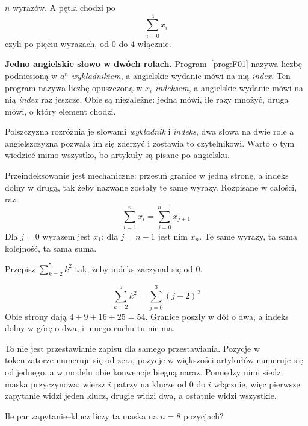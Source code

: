 \begin{fr}
\begin{ansblock}
$n$ wyrazów. A pętla chodzi po
\[ \sum_{i=0}^{4} x_i \]
czyli po pięciu wyrazach, od $0$ do $4$ włącznie.
\end{ansblock}

\begin{notationbox}
\textbf{Jedno angielskie słowo w dwóch rolach.} Program~\ref{prog:F01} nazywa
liczbę podniesioną w $a^{n}$ \emph{wykładnikiem}, a angielskie wydanie mówi na
nią \emph{index}. Ten program nazywa liczbę opuszczoną w $x_i$
\emph{indeksem}, a angielskie wydanie mówi na nią \emph{index} raz jeszcze.
Obie są niezależne: jedna mówi, ile razy mnożyć, druga mówi, o który element
chodzi.

Polszczyzna rozróżnia je słowami \dash{} \emph{wykładnik} i \emph{indeks},
dwa słowa na dwie role \dash{} a angielszczyzna pozwala im się zderzyć i
zostawia to czytelnikowi. Warto o tym wiedzieć mimo wszystko, bo artykuły są
pisane po angielsku.
\end{notationbox}

Przeindeksowanie jest mechaniczne: przesuń granice w jedną stronę, a indeks
dolny w drugą, tak żeby nazwane zostały te same wyrazy. Rozpisane w całości,
raz:
\[ \sum_{i=1}^{n} x_i = \sum_{j=0}^{n-1} x_{j+1} \]
Dla $j = 0$ wyrazem jest $x_1$; dla $j = n-1$ jest nim $x_n$. Te same wyrazy,
ta sama kolejność, ta sama suma.

Przepisz $\sum_{k=2}^{5} k^{2}$ tak, żeby indeks zaczynał się od $0$.
\nextframe
\end{fr}

\begin{fr}
\begin{ansblock}
\[ \sum_{k=2}^{5} k^{2} = \sum_{j=0}^{3} (j+2)^{2} \]
Obie strony dają $4 + 9 + 16 + 25 = 54$. Granice poszły w dół o dwa, a indeks
dolny w górę o dwa, i innego ruchu tu nie ma.
\end{ansblock}

To nie jest przestawianie zapisu dla samego przestawiania. Pozycje w
tokenizatorze numeruje się od zera, pozycje w większości artykułów numeruje
się od jednego, a w modelu obie konwencje biegną naraz. Pomiędzy nimi siedzi
maska przyczynowa: wiersz $i$ patrzy na klucze od $0$ do $i$ włącznie, więc
pierwsze zapytanie widzi jeden klucz, drugie widzi dwa, a ostatnie widzi
wszystkie.

Ile par zapytanie--klucz liczy ta maska na $n = 8$ pozycjach?
\nextframe
\end{fr}

